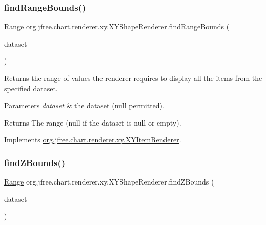 \subsubsection{\texorpdfstring{find\+Range\+Bounds()}{findRangeBounds()}}
{\footnotesize\ttfamily \mbox{\hyperlink{classorg_1_1jfree_1_1data_1_1_range}{Range}} org.\+jfree.\+chart.\+renderer.\+xy.\+X\+Y\+Shape\+Renderer.\+find\+Range\+Bounds (\begin{DoxyParamCaption}\item[{\mbox{\hyperlink{interfaceorg_1_1jfree_1_1data_1_1xy_1_1_x_y_dataset}{X\+Y\+Dataset}}}]{dataset }\end{DoxyParamCaption})}

Returns the range of values the renderer requires to display all the items from the specified dataset.


\begin{DoxyParams}{Parameters}
{\em dataset} & the dataset ({\ttfamily null} permitted).\\
\hline
\end{DoxyParams}
\begin{DoxyReturn}{Returns}
The range ({\ttfamily null} if the dataset is {\ttfamily null} or empty). 
\end{DoxyReturn}


Implements \mbox{\hyperlink{interfaceorg_1_1jfree_1_1chart_1_1renderer_1_1xy_1_1_x_y_item_renderer_af9ac6f440e99c73d343de7851e89496a}{org.\+jfree.\+chart.\+renderer.\+xy.\+X\+Y\+Item\+Renderer}}.

\mbox{\label{classorg_1_1jfree_1_1chart_1_1renderer_1_1xy_1_1_x_y_shape_renderer_a2cde90f02e394826bb5a3db9c02f2958}} 
\subsubsection{\texorpdfstring{find\+Z\+Bounds()}{findZBounds()}}
{\footnotesize\ttfamily \mbox{\hyperlink{classorg_1_1jfree_1_1data_1_1_range}{Range}} org.\+jfree.\+chart.\+renderer.\+xy.\+X\+Y\+Shape\+Renderer.\+find\+Z\+Bounds (\begin{DoxyParamCaption}\item[{\mbox{\hyperlink{interfaceorg_1_1jfree_1_1data_1_1xy_1_1_x_y_z_dataset}{X\+Y\+Z\+Dataset}}}]{dataset }\end{DoxyParamCaption})}

